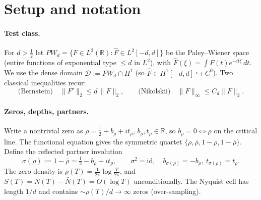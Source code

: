 \documentclass[11pt]{amsart}
\theoremstyle{definition}
\theoremstyle{remark}
\newcommand{\half}{\tfrac12}
\newcommand{\PW}{\mathit{PW}_d}
\newcommand{\Norm}[1]{\lVert #1 \rVert}
\begin{document}
\section{Setup and notation}\label{sec:setup}

\paragraph{Test class.} For $d>\half$ let
$\PW=\{F\in L^{2}(\mathbb R): \widehat F\in L^{2}[-d,d]\}$ be the Paley--Wiener space
(entire functions of exponential type $\le d$ in $L^{2}$), with
$\widehat F(\xi)=\int F(t)e^{-it\xi}\,dt$. We use the dense domain
$\mathcal D:=\PW\cap H^{1}$ (so $\widehat F\in H^{1}[-d,d]\hookrightarrow C^{0}$). Two
classical inequalities recur:
\begin{equation}\label{eq:bernstein}
\text{(Bernstein)}\quad \Norm{F'}_{2}\le d\,\Norm{F}_{2},\qquad
\text{(Nikolskii)}\quad \Norm{F}_{\infty}\le C_{d}\Norm{F}_{2}.
\end{equation}

\paragraph{Zeros, depths, partners.} Write a nontrivial zero as
$\rho=\half+b_\rho+it_\rho$, $b_\rho,t_\rho\in\mathbb R$, so $b_\rho=0\iff\rho$ on the
critical line. The functional equation gives the symmetric quartet
$\{\rho,\bar\rho,1-\rho,1-\bar\rho\}$. Define the reflected partner involution
\begin{equation}\label{eq:sigma}
\sigma(\rho):=1-\bar\rho=\half-b_\rho+it_\rho,\qquad
\sigma^{2}=\mathrm{id},\quad b_{\sigma(\rho)}=-b_\rho,\ t_{\sigma(\rho)}=t_\rho.
\end{equation}
The zero density is $\rho(T)=\tfrac1{2\pi}\log\tfrac T{2\pi}$, and $S(T)=N(T)-\bar
N(T)=O(\log T)$ unconditionally. The Nyquist cell has length $1/d$ and contains
$\sim\rho(T)/d\to\infty$ zeros (over-sampling).
\end{document}
